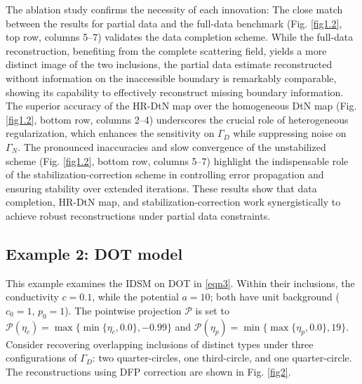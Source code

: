 \documentclass[onefignum,onetabnum]{siamart190516}
\numberwithin{equation}{section}
\begin{document}
The ablation study confirms the necessity of each innovation:
The close match between the results for partial data and the full-data benchmark (Fig. \ref{fig1.2}, top row, columns 5–7) validates the data completion scheme.
{While the full-data reconstruction, benefiting from the complete scattering field, yields a more distinct image of the two inclusions, the partial data estimate reconstructed without information on the inaccessible boundary is remarkably comparable, showing its capability to effectively reconstruct missing boundary information.}
The superior accuracy of the HR-DtN map over the homogeneous DtN map (Fig. \ref{fig1.2}, bottom row, columns 2–4) underscores the crucial role of heterogeneous regularization, which enhances the sensitivity on $\Gamma_D$ while suppressing noise on $\Gamma_N$.
The pronounced inaccuracies and slow convergence of the unstabilized scheme (Fig. \ref{fig1.2}, bottom row, columns 5–7) highlight the indispensable role of the stabilization-correction scheme in controlling error propagation and ensuring stability {over extended iterations}.
These results show that data completion, HR-DtN map, and stabilization-correction work synergistically to achieve robust reconstructions under partial data constraints.

\subsection{Example 2: DOT model}\label{exam2}

This example examines the IDSM on DOT in \eqref{eqn3}.
Within their inclusions, the conductivity $c = 0.1$, while the potential $a = 10$; both have unit background ($c_0 = 1$, $p_0 = 1$).
The pointwise projection $\mathcal{P}$ is set to $
\mathcal{P}(\eta_c)=\max\{\min\{\eta_{c}, 0.0\}, -0.99\}$ and $\mathcal{P}(\eta_{p})=
\min\{\max\{\eta_{p}, 0.0\}, 19\}$.
Consider recovering overlapping inclusions of distinct types under three configurations of $\Gamma_D$: two quarter-circles, one third-circle, and one quarter-circle.
The reconstructions using DFP correction are shown in Fig. \ref{fig2}.
\end{document}
